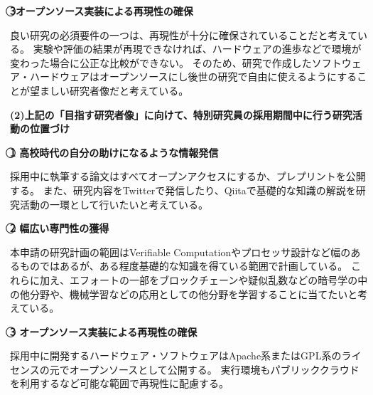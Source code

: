 \noindent\textbf{\textcircled{3}オープンソース実装による再現性の確保}

良い研究の必須要件の一つは、再現性が十分に確保されていることだと考えている。
実験や評価の結果が再現できなければ、ハードウェアの進歩などで環境が変わった場合に公正な比較ができない。
そのため、研究で作成したソフトウェア・ハードウェアはオープンソースにし後世の研究で自由に使えるようにすることが望ましい研究者像だと考えている。



\vspace{5mm}
\noindent
\textbf{(2)上記の「目指す研究者像」に向けて、特別研究員の採用期間中に行う研究活動の位置づけ}

\noindent\textbf{\textcircled{1} 高校時代の自分の助けになるような情報発信}

採用中に執筆する論文はすべてオープンアクセスにするか、プレプリントを公開する。
また、研究内容をTwitterで発信したり、Qiitaで基礎的な知識の解説を研究活動の一環として行いたいと考えている。

\noindent\textbf{\textcircled{2} 幅広い専門性の獲得}

本申請の研究計画の範囲はVerifiable Computationやプロセッサ設計など幅のあるものではあるが、ある程度基礎的な知識を得ている範囲で計画している。
これらに加え、エフォートの一部をブロックチェーンや疑似乱数などの暗号学の中の他分野や、機械学習などの応用としての他分野を学習することに当てたいと考えている。

\noindent\textbf{\textcircled{3} オープンソース実装による再現性の確保}

採用中に開発するハードウェア・ソフトウェアはApache系またはGPL系のライセンスの元でオープンソースとして公開する。
実行環境もパブリッククラウドを利用するなど可能な範囲で再現性に配慮する。








